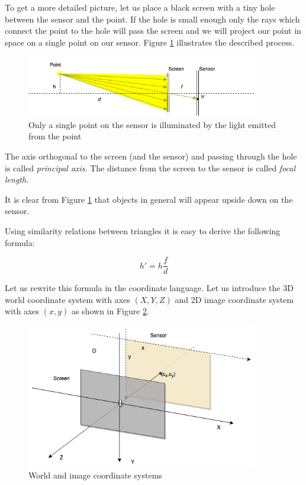 \documentclass[a4paper,10pt]{article}
\begin{document}
To get a more detailed picture, let us place a black screen with a tiny hole between the sensor and the point. If the hole is small enough only the rays which connect the point to the hole will pass the screen and we will project our point in space on a single point on our sensor.  Figure \ref{fig:pinhole} illustrates the described process. 
\begin{figure}[h]
\centering
 \includegraphics[width=0.9\textwidth]{../../images/pinhole_point.png}
 \caption{Only a single point on the sensor is illuminated by the light emitted from the point}
 \label{fig:pinhole}
\end{figure}

The axis orthogonal to the screen (and the sensor) and passing through the hole is called {\it principal axis}. The distance from the screen to the sensor is called {\it focal length}. 

It is clear from Figure \ref{fig:pinhole} that objects in general will appear upside down on the sensor. 

Using similarity relations between triangles it is easy to derive the following formula:

\begin{equation}                                                                                                                                                                         
h' = h\frac{f}{d}
\label{pinhole_ratio}
\end{equation}

Let us rewrite this formula in the coordinate language. Let us introduce  the 3D world coordinate system  with axes $(X,Y,Z)$ and 2D image coordinate system with axes $(x,y)$ as shown in Figure \ref{fig:pinhole_coordinates}.

\begin{figure}[h]
\centering
 \includegraphics[width=0.9\textwidth]{../../images/pinhole_coords.png}
 \caption{World and image coordinate systems}
 \label{fig:pinhole_coordinates}
\end{figure}
\end{document}

